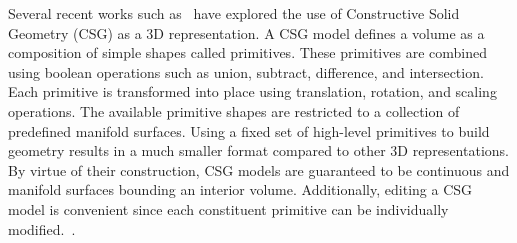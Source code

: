 Several recent works such as~\cite{Sharma2018, Kania2020, Ren2021} have explored the use of Constructive Solid Geometry (CSG) as a 3D representation. A CSG model defines a volume as a composition of simple shapes called primitives. These primitives are combined using boolean operations such as union, subtract, difference, and intersection. Each primitive is transformed into place using translation, rotation, and scaling operations. The available primitive shapes are restricted to a collection of predefined manifold surfaces. Using a fixed set of high-level primitives to build geometry results in a much smaller format compared to other 3D representations. By virtue of their construction, CSG models are guaranteed to be continuous and manifold surfaces bounding an interior volume. Additionally, editing a CSG model is convenient since each constituent primitive can be individually modified.~\cite{Hughes2013}.

